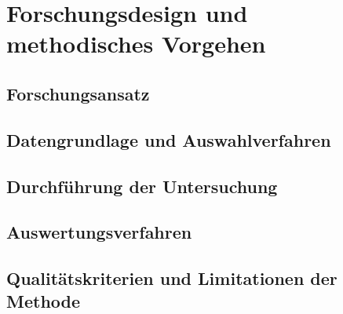 \chapter{Forschungsdesign und methodisches Vorgehen}
\label{sec:Forschungsdesign}


\section{Forschungsansatz}
\label{sec:Forschungsansatz}

\section{Datengrundlage und Auswahlverfahren}
\label{sec:Datengrundlage}

\section{Durchführung der Untersuchung}
\label{sec:Durchfuehrung}

\section{Auswertungsverfahren}
\label{sec:Auswertungsverfahren}

\section{Qualitätskriterien und Limitationen der Methode}
\label{sec:Qualitaetskriterien}
